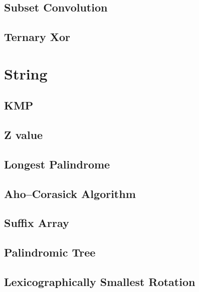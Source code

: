 \documentclass[a4paper,10pt,twocolumn,oneside]{article}
\begin{document}
\subsection{Subset Convolution}


\subsection{Ternary Xor}




\section{String}

\subsection{KMP}


\subsection{Z value}


\subsection{Longest Palindrome}


\subsection{Aho–Corasick Algorithm}


\subsection{Suffix Array}


\subsection{Palindromic Tree}


\subsection{Lexicographically Smallest Rotation}

\end{document}
